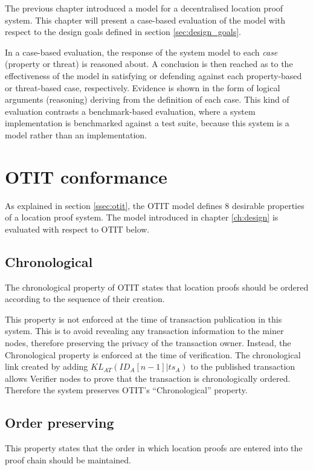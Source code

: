 The previous chapter introduced a model for a decentralised location proof system. This chapter will present a case-based evaluation of the model with respect to the design goals defined in section \ref{sec:design_goals}.

In a case-based evaluation, the response of the system model to each \textit{case} (property or threat) is reasoned about. A conclusion is then reached as to the effectiveness of the model in satisfying or defending against each property-based or threat-based case, respectively. Evidence is shown in the form of logical arguments (reasoning) deriving from the definition of each case. This kind of evaluation contrasts a benchmark-based evaluation, where a system implementation is benchmarked against a test suite, because this system is a model rather than an implementation.

\section{OTIT conformance}
As explained in section \ref{ssec:otit}, the OTIT model \cite{otit} defines 8 desirable properties of a location proof system. The model introduced in chapter \ref{ch:design} is evaluated with respect to OTIT below.

\subsection{Chronological}
The chronological property of OTIT states that location proofs should be ordered according to the sequence of their creation.

This property is not enforced at the time of transaction publication in this system. This is to avoid revealing any transaction information to the miner nodes, therefore preserving the privacy of the transaction owner. Instead, the Chronological property is enforced at the time of verification. The chronological link created by adding $KL_{AT}(ID_{A}[n-1]|ts_A)$ to the published transaction allows Verifier nodes to prove that the transaction is chronologically ordered. Therefore the system preserves OTIT's ``Chronological'' property.

\subsection{Order preserving}
This property states that the order in which location proofs are entered into the proof chain should be maintained.


